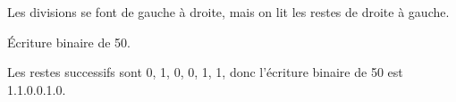 \documentclass[11pt,class=report,crop=false]{standalone}
\begin{document}
\begin{cours}
\begin{exemple}
Les divisions se font de gauche à droite, mais on lit les restes de droite à gauche.

\end{exemple}

\begin{exemple}
Écriture binaire de 50.


Les restes successifs sont 0, 1, 0, 0, 1, 1, donc l'écriture binaire de 50 est 1.1.0.0.1.0.
\end{exemple}


\end{cours}



\end{document}
